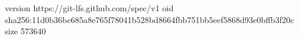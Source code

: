 version https://git-lfs.github.com/spec/v1
oid sha256:11d0b36be685a8e765f78041b528bd8664fbb751bb5eef5868d93e0bffb3f20c
size 573640
